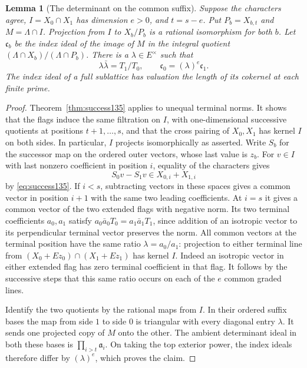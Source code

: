 \documentclass[a4paper,11pt]{article}
\newtheorem{lemma}[proposition]{Lemma}
\theoremstyle{definition}
\theoremstyle{remark}
\numberwithin{equation}{section}
\begin{document}
\begin{lemma}[The determinant on the common suffix]
\leavevmode\label{lem:suffixdet556}
Suppose the characters agree, \(I=X_0\cap X_1\) has dimension
\(e>0\), and \(t=s-e\). Put \(P_b=X_{b,t}\) and \(M=\Lambda\cap I\).
Projection from \(I\) to \(X_b/P_b\) is a rational isomorphism
for both \(b\). Let \(\mathfrak c_b\) be the index ideal of the
image of \(M\) in the integral quotient
\((\Lambda\cap X_b)/(\Lambda\cap P_b)\). There is a
\(\lambda\in E^\times\) such that
\[
       \lambda\bar\lambda=T_1/T_0,\qquad
       \mathfrak c_0=(\lambda)^e\mathfrak c_1 .
\]
The index ideal of a full sublattice has valuation the length
of its cokernel at each finite prime.
\end{lemma}
\begin{proof}
Theorem~\ref{thm:success135} applies to unequal terminal norms.
It shows that the flags induce the same filtration on \(I\),
with one-dimensional successive quotients at positions
\(t+1,\ldots,s\), and that the cross pairing of \(X_0,X_1\)
has kernel \(I\) on both sides. In particular, \(I\) projects
isomorphically as asserted. Write \(S_b\) for the successor
map on the ordered outer vectors, whose last value is \(z_b\).
For \(v\in I\) with last nonzero coefficient in position \(i\),
equality of the characters gives
\[
             S_0v-S_1v\in X_{0,i}+X_{1,i}
\]
by \eqref{eq:success135}. If \(i<s\), subtracting vectors in
these spaces gives a common vector in position \(i+1\) with
the same two leading coefficients. At \(i=s\) it gives a
common vector of the two extended flags with negative norm.
Its two terminal coefficients \(a_0,a_1\) satisfy
\(a_0\bar a_0T_0=a_1\bar a_1T_1\), since addition of an
isotropic vector to its perpendicular terminal vector preserves
the norm. All common vectors at the terminal position have the
same ratio \(\lambda=a_0/a_1\): projection to either terminal
line from \((X_0+Ez_0)\cap(X_1+Ez_1)\) has kernel \(I\).
Indeed an isotropic vector in either extended flag has zero
terminal coefficient in that flag. It follows by the successive
steps that this same ratio occurs on each of the \(e\) common
graded lines.

Identify the two quotients by the rational maps from \(I\).
In their ordered suffix bases the map from side \(1\) to
side \(0\) is triangular with every diagonal entry
\(\lambda\). It sends one projected copy of \(M\) onto the
other. The ambient determinant ideal in both these bases is
\(\prod_{i>t}\mathfrak a_i\). On taking the top exterior
power, the index ideals therefore differ by
\((\lambda)^e\), which proves the claim.
\end{proof}
\end{document}
